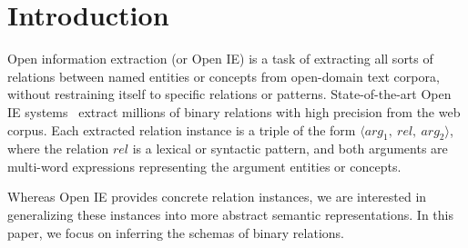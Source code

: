 \section{Introduction}

Open information extraction (or Open IE) is a task of extracting
all sorts of relations between named entities or concepts
from open-domain text corpora, without restraining itself
to specific relations or patterns.
State-of-the-art Open IE systems~\cite{carlson2010toward,fader2011identifying,schmitz2012open,nakashole2012patty}
extract millions of binary relations with high precision from the web corpus.
Each extracted relation instance is a triple of the form
$\langle arg_1,\ rel,\ arg_2 \rangle$, where the relation
$rel$ is a lexical or syntactic pattern, and both
arguments are multi-word expressions representing the argument entities or
concepts.

Whereas Open IE provides concrete relation instances,
we are interested in generalizing these instances into
more abstract semantic representations.
In this paper, we focus on inferring the schemas of
binary relations.




